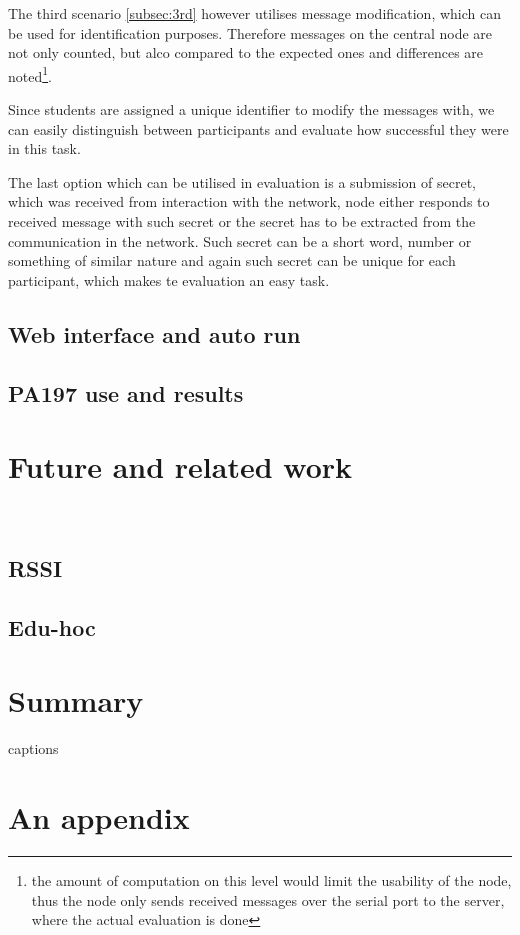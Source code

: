 \documentclass[
  digital, %
  table,   %
  nolof,     %
  nolot,     %
           oneside
]{fithesis3}
\begin{document}
  The third scenario \ref{subsec:3rd} however utilises message modification, which can be used for identification purposes. Therefore messages on the central node are not only counted, but alco compared to the expected ones and differences are noted\footnote{the amount of computation on this level would limit the usability of the node, thus the node only sends received messages over the serial port to the server, where the actual evaluation is done}.

  Since students are assigned a unique identifier to modify the messages with, we can easily distinguish between participants and evaluate how successful they were in this task.

  The last option which can be utilised in evaluation is a submission of secret, which was received from interaction with the network, node either responds to received message with such secret or the secret has to be extracted from the communication in the network. Such secret can be a short word, number or something of similar nature and again such secret can be unique for each participant, which makes te evaluation an easy task.
  \section{Web interface and auto run}
  \section{PA197 use and results} \label{sec:PA197}
\chapter{Future and related work}\
  \section{RSSI}
  \section{Edu-hoc}
\chapter{Summary}




{\csname captions\languagename\endcsname %
\makeatletter %
  \thesis@selectLocale{\thesis@locale}\makeatother
\printbibliography[heading=bibintoc]} %

\appendix %
\chapter{An appendix}
\end{document}
